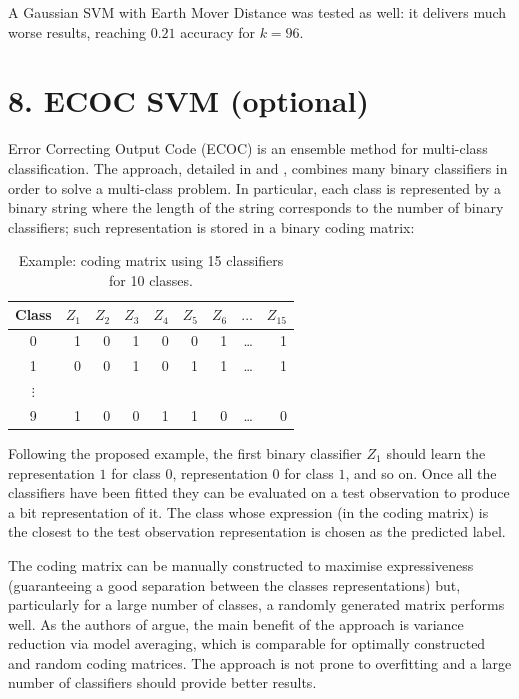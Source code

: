 \documentclass[12pt]{article}
\begin{document}
  A Gaussian SVM with Earth Mover Distance was tested as well: it delivers much worse results, reaching \( 0.21 \) accuracy for \( k = 96 \).


  
  \section*{8. ECOC SVM (optional)}

  Error Correcting Output Code (ECOC) is an ensemble method for multi-class classification. The approach, detailed in \cite{dietterich1994solving} and \cite{james1998error}, combines many binary classifiers in order to solve a multi-class problem. In particular, each class is represented by a binary string where the length of the string corresponds to the number of binary classifiers; such representation is stored in a binary coding matrix:

	\begin{table}[H] 
		\centering
		\caption*{Example: coding matrix using 15 classifiers for 10 classes.}
		\begin{tabular}{crrrrrrrr}
			\toprule
      Class & \( Z_1 \) & \( Z_2 \) & \( Z_3 \) & \( Z_4 \) & \( Z_5 \) & \( Z_6 \) & \( \dots \) & \( Z_{15} \) \\
      \midrule
      0 & 1 & 0 & 1 & 0 & 0 & 1 & \dots & 1 \\
      1 & 0 & 0 & 1 & 0 & 1 & 1 & \dots & 1 \\
      \( \vdots \) & & & & &  & & & \\
      9 & 1 & 0 & 0 & 1 & 1 & 0 &\dots & 0 \\
			\bottomrule
		\end{tabular}
	\end{table}

  Following the proposed example, the first binary classifier \( Z_1 \) should learn the representation \( 1 \) for class \( 0 \), representation \( 0 \) for class \( 1 \), and so on. Once all the classifiers have been fitted they can be evaluated on a test observation to produce a bit representation of it. The class whose expression (in the coding matrix) is the closest to the test observation representation is chosen as the predicted label.

  The coding matrix can be manually constructed to maximise expressiveness (guaranteeing a good separation between the classes representations) but, particularly for a large number of classes, a randomly generated matrix performs well. As the authors of \cite{james1998error} argue, the main benefit of the approach is variance reduction via model averaging, which is comparable for optimally constructed and random coding matrices. The approach is not prone to overfitting and a large number of classifiers should provide better results.
\end{document}
